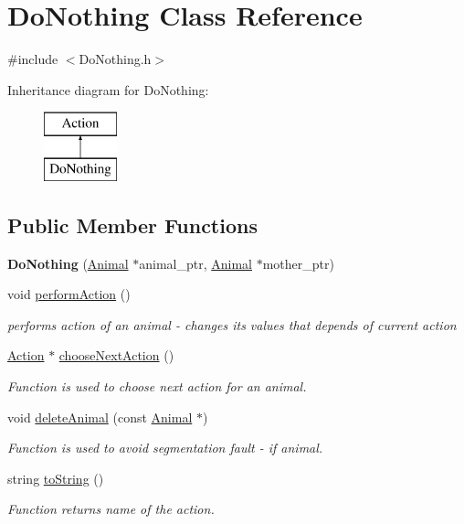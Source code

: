 \hypertarget{class_do_nothing}{}\section{Do\+Nothing Class Reference}
\label{class_do_nothing}


{\ttfamily \#include $<$Do\+Nothing.\+h$>$}

Inheritance diagram for Do\+Nothing\+:\begin{figure}[H]
\begin{center}
\leavevmode
\includegraphics[height=2.000000cm]{class_do_nothing}
\end{center}
\end{figure}
\subsection*{Public Member Functions}
\begin{DoxyCompactItemize}
\item 
\hypertarget{class_do_nothing_a07c31cc665631fbb7297c340ee37127e}{}{\bfseries Do\+Nothing} (\hyperlink{class_animal}{Animal} $\ast$animal\+\_\+ptr, \hyperlink{class_animal}{Animal} $\ast$mother\+\_\+ptr)\label{class_do_nothing_a07c31cc665631fbb7297c340ee37127e}

\item 
void \hyperlink{class_do_nothing_a62278199ca50f424ec0de4558ba7efa9}{perform\+Action} ()
\begin{DoxyCompactList}\small\item\em performs action of an animal -\/ changes it\textquotesingle{}s values that depends of current action \end{DoxyCompactList}\item 
\hyperlink{class_action}{Action} $\ast$ \hyperlink{class_do_nothing_af829f1fc1893c5f9c31e8632c4dbe2cc}{choose\+Next\+Action} ()
\begin{DoxyCompactList}\small\item\em Function is used to choose next action for an animal. \end{DoxyCompactList}\item 
void \hyperlink{class_do_nothing_ae01160976750e98bf22bc34f773ea264}{delete\+Animal} (const \hyperlink{class_animal}{Animal} $\ast$)
\begin{DoxyCompactList}\small\item\em Function is used to avoid segmentation fault -\/ if animal. \end{DoxyCompactList}\item 
string \hyperlink{class_do_nothing_ab9e24b3640d4e8125cba091df9d16e7b}{to\+String} ()
\begin{DoxyCompactList}\small\item\em Function returns name of the action. \end{DoxyCompactList}\end{DoxyCompactItemize}
